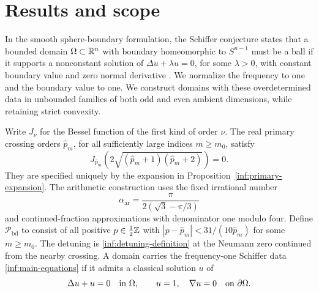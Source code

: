 \section{Results and scope}\label{inf:sec-introduction}

In the smooth sphere-boundary formulation, the Schiffer conjecture
states that a bounded domain $\Omega\subset\mathbb{R}^n$ with boundary
homeomorphic to $S^{n-1}$ must be a ball if it supports a nonconstant
solution of $\Delta u+\lambda u=0$, for some $\lambda>0$, with
constant boundary value and zero normal derivative
\cite{inf:Wil76,inf:Zal92}. We normalize the frequency to one and
the boundary value to one. We construct domains with these
overdetermined data in unbounded families of both odd and even ambient
dimensions, while retaining strict convexity.

Write $J_\nu$ for the Bessel function of the first kind of order $\nu$.
The real primary crossing orders $\widehat p_m$, for all sufficiently
large indices $m\ge m_0$, satisfy
\[
 J_{\widehat p_m}(2\sqrt{(\widehat p_m+1)(\widehat p_m+2)})=0.
\]
They are specified uniquely by the expansion in
Proposition~\ref{inf:primary-expansion}. The arithmetic construction
uses the fixed irrational number
\[
 \alpha_{\mathrm{ar}}=\frac{\pi}{2(\sqrt3-\pi/3)}
\]
and continued-fraction approximations with denominator one modulo
four. Define $\mathcal P_{\mathrm{bd}}$ to consist of all positive
$p\in\tfrac12\mathbb{Z}$ with $|p-\widehat p_m|<31/(10\widehat p_m)$
for some $m\ge m_0$. The detuning is \eqref{inf:detuning-definition}
at the Neumann zero continued from the nearby crossing.
A domain carries the frequency-one Schiffer data
\eqref{inf:main-equations} if it admits a classical solution $u$ of
\begin{equation}\label{inf:main-equations}
 \Delta u+u=0\quad\hbox{in }\Omega,\qquad
 u=1,\quad\nabla u=0\quad\hbox{on }\partial\Omega.
\end{equation}
